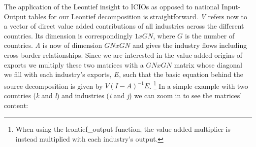 \documentclass[a4paper]{article}\usepackage[]{graphicx}\usepackage[]{color}
\begin{document}
The application of the Leontief insight to ICIOs as opposed to national
Input-Output tables for our Leontief decomposition is straightforward.
\textit{V} refers now to a vector of direct value added contributions
of all industries across the different countries. Its dimension is
correspondingly $1xGN$, where $G$ is the number of countries. \textit{A}
is now of dimension $GNxGN$ and gives the industry flows including
cross border relationships. Since we are interested in the value added
origins of exports we multiply these two matrices with a $GNxGN$
matrix whose diagonal we fill with each industry's exports, $E$,
such that the basic equation behind the source decomposition is given
by $V(I-A)^{-1}E$. \footnote{When using the leontief\_output function, the value added multiplier
is instead multiplied with each industry's output.} In a simple example with two countries (\textit{k} and \textit{l})
and industries (\textit{i} and \textit{j}) we can zoom in to see the
matrices' content:
\end{document}
